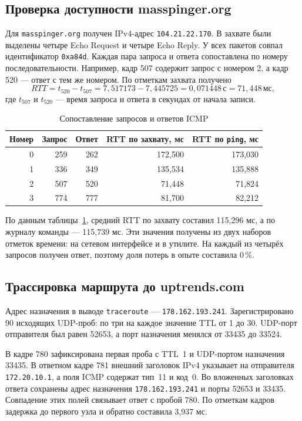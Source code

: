 \documentclass[a4paper,14pt]{extarticle}
\begin{document}
\subsection{Проверка доступности masspinger.org}

Для \texttt{masspinger.org} получен IPv4-адрес \texttt{104.21.22.170}. В захвате были выделены четыре Echo Request и четыре Echo Reply. У всех пакетов совпал идентификатор \texttt{0xa84d}. Каждая пара запроса и ответа сопоставлена по номеру последовательности. Например, кадр 507 содержит запрос с номером 2, а кадр 520 --- ответ с тем же номером. По отметкам захвата получено
\[
  RTT = t_{520} - t_{507}
      = 7{,}517173 - 7{,}445725
      = 0{,}071448\,\text{с} = 71{,}448\,\text{мс},
\]
где $t_{507}$ и $t_{520}$ --- время запроса и ответа в секундах от начала записи.

\begin{table}[htbp]
  \centering
  \caption{Сопоставление запросов и ответов ICMP}
  \label{tab:ping}
  \begin{tabular}{@{}r r r r r@{}}
    \toprule
    Номер & Запрос & Ответ & RTT по захвату, мс & RTT по \texttt{ping}, мс \\
    \midrule
    0 & 259 & 262 & 172,500 & 173,030 \\
    1 & 336 & 349 & 135,534 & 135,888 \\
    2 & 507 & 520 & 71,448 & 71,824 \\
    3 & 774 & 777 & 81,700 & 82,212 \\
    \bottomrule
  \end{tabular}
\end{table}

По данным таблицы~\ref{tab:ping}, средний RTT по захвату составил 115,296 мс, а по журналу команды --- 115,739 мс. Эти значения получены из двух наборов отметок времени: на сетевом интерфейсе и в утилите. На каждый из четырёх запросов получен ответ, поэтому доля потерь в опыте составила 0\,\%.
\clearpage

\subsection{Трассировка маршрута до uptrends.com}

Адрес назначения в выводе \texttt{traceroute} --- \texttt{178.162.193.241}. Зарегистрировано 90 исходящих UDP-проб: по три на каждое значение TTL от 1 до 30. UDP-порт отправителя был равен 52653, а порт назначения менялся от 33435 до 33524.

В кадре 780 зафиксирована первая проба с TTL~1 и UDP-портом назначения 33435. В ответном кадре 781 внешний заголовок IPv4 указывает на отправителя \texttt{172.20.10.1}, а поля ICMP содержат тип~11 и код~0. Во вложенных заголовках ответа сохранены адрес назначения \texttt{178.162.193.241} и порты 52653 и 33435. Совпадение этих полей связывает ответ с пробой 780. По отметкам кадров задержка до первого узла и обратно составила 3,937 мс.
\end{document}
